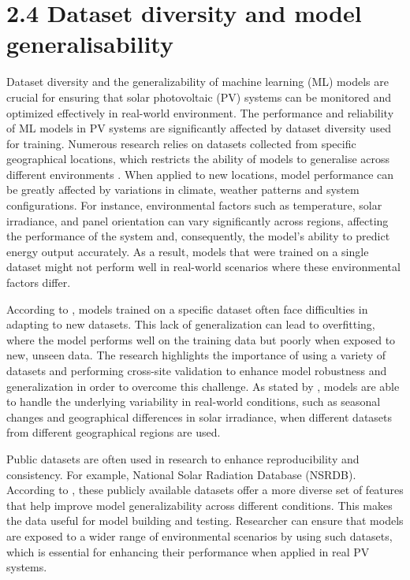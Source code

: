 \section{2.4 Dataset diversity and model generalisability}
Dataset diversity and the generalizability of machine learning (ML) models are crucial for ensuring that solar photovoltaic (PV) systems can be monitored and optimized effectively in real-world environment. The performance and reliability of ML models in PV systems are significantly affected by dataset diversity used for training. Numerous research relies on datasets collected from specific geographical locations, which restricts the ability of models to generalise across different environments \parencite{Massidda et al._2025}. When applied to new locations, model performance can be greatly affected by variations in climate, weather patterns and system configurations. For instance, environmental factors such as temperature, solar irradiance, and panel orientation can vary significantly across regions, affecting the performance of the system and, consequently, the model’s ability to predict energy output accurately. As a result, models that were trained on a single dataset might not perform well in real-world scenarios where these environmental factors differ.

According to \parencite{Zhang et al._2020}, models trained on a specific dataset often face difficulties in adapting to new datasets. This lack of generalization can lead to overfitting, where the model performs well on the training data but poorly when exposed to new, unseen data. The research highlights the importance of using a variety of datasets and performing cross-site validation to enhance model robustness and generalization in order to overcome this challenge. As stated by \parencite{Shen et al._2020}, models are able to handle the underlying variability in real-world conditions, such as seasonal changes and geographical differences in solar irradiance, when different datasets from different geographical regions are used.

Public datasets are often used in research to enhance reproducibility and consistency. For example, National Solar Radiation Database (NSRDB). According to \parencite{De Silva et al._2024}, these publicly available datasets offer a more diverse set of features that help improve model generalizability across different conditions. This makes the data useful for model building and testing. Researcher can ensure that models are exposed to a wider range of environmental scenarios by using such datasets, which is essential for enhancing their performance when applied in real PV systems.

